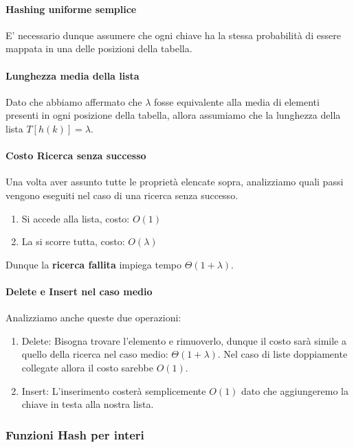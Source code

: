 \documentclass{article}
\begin{document}
\paragraph{Hashing uniforme semplice} E' necessario dunque assumere che ogni chiave ha la stessa probabilità di essere mappata in una delle posizioni della tabella.

\paragraph{Lunghezza media della lista} Dato che abbiamo affermato che $\lambda$ fosse equivalente alla media di elementi presenti in ogni posizione della tabella, allora assumiamo che la lunghezza della lista $T[h(k)] = \lambda$.

\paragraph{Costo Ricerca senza successo} Una volta aver assunto tutte le proprietà elencate sopra, analizziamo quali passi vengono eseguiti nel caso di una ricerca senza successo.

\begin{enumerate}
    \item Si accede alla lista, costo: $O(1)$
    \item La si scorre tutta, costo: $O(\lambda)$
\end{enumerate}

Dunque la \textbf{ricerca fallita} impiega tempo $\Theta(1+\lambda)$.

\newpage

\paragraph{Delete e Insert nel caso medio} Analizziamo anche queste due operazioni:

\begin{enumerate}
    \item Delete: Bisogna trovare l'elemento e rimuoverlo, dunque il costo sarà simile a quello della ricerca nel caso medio: $\Theta(1+\lambda)$. Nel caso di liste doppiamente collegate allora il costo sarebbe $O(1)$.
    \item Insert: L'inserimento costerà semplicemente $O(1)$ dato che aggiungeremo la chiave in testa alla nostra lista.
\end{enumerate}

\subsubsection{Funzioni Hash per interi}
\end{document}
